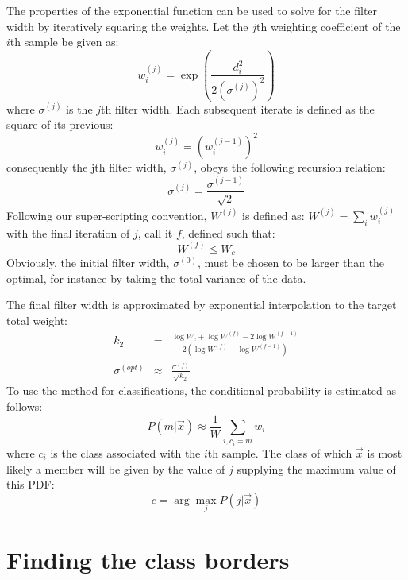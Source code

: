 The properties of the exponential function can be used to 
solve for the filter width by iteratively squaring the weights.  Let the $j$th
weighting coefficient of the $i$th sample be given as:
\begin{equation}
w_i^{(j)} = \exp \left ( \frac{d_i^2}{2 ( \sigma^{(j)})^2} \right )
\end{equation}
where $\sigma^{(j)}$ is the $j$th filter width.  Each subsequent iterate is
defined as the square of its previous:
\begin{equation}
w_i^{(j)} = \left (w_i^{(j-1)} \right )^2
\end{equation}
consequently the jth filter width, $\sigma^{(j)}$, obeys the following
recursion relation:
\begin{equation}
\sigma^{(j)} = \frac{\sigma^{(j-1)}}{\sqrt{2}}
\end{equation}
Following our super-scripting convention, $W^{(j)}$ is defined as:
$W^{(j)} = \sum_i w_i^{(j)}$ with the final iteration of $j$, call it
$f$, defined such that:
\begin{equation}
W^{(f)} \le W_c
\end{equation}
Obviously, the initial filter width, $\sigma^{(0)}$, must be chosen to be larger
than the optimal, for instance by taking the total variance of the data.

The final filter width is approximated by exponential interpolation to
the target total weight:
\begin{eqnarray}
k_2 & = & \frac{\log W_c + \log W^{(f)} - 2 \log W^{(f-1)}}{2\left
	(\log W^{(f)} - \log W^{(f-1)}\right )} \\
\sigma^{(opt)} & \approx & \frac{\sigma^{(f)}}{\sqrt{k_2}}
\end{eqnarray}
To use the method for classifications, the
conditional probability is estimated as follows:
\begin{equation}
P(m | \vec x) \approx \frac{1}{W} \sum_{i, c_i=m} w_i
\end{equation}
where $c_i$ is the class associated with the $i$th sample.
The class of which $\vec{x}$ is most likely a member
will be given by the value of $j$ supplying the maximum value of this PDF:
\begin{equation}
c=\arg \underset {j} {\max} P(j | \vec{x})
\label{class_mle}
\end{equation}

\section{Finding the class borders}

